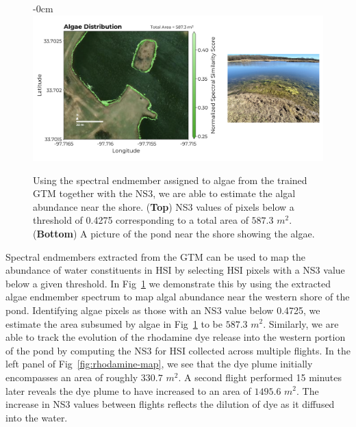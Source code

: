 \documentclass[remotesensing,article,submit,pdftex,moreauthors]{Definitions/mdpi}
\begin{document}
\begin{figure}[t]
\begin{adjustwidth}{-\extralength}{0cm}
\centering
\includegraphics[width=17.0cm]{paper/figures/results/algae.png}
\end{adjustwidth}
\caption{Using the spectral endmember assigned to algae from the trained GTM together with the NS3, we are able to estimate the algal abundance near the shore. (\textbf{Top}) NS3 values of pixels below a threshold of 0.4275 corresponding to a total area of $587.3$ $m^2$. (\textbf{Bottom}) A picture of the pond near the shore showing the algae.\label{fig:algae-map}}
\end{figure}  

Spectral endmembers extracted from the GTM can be used to map the abundance of water constituents in HSI by selecting HSI pixels with a NS3 value below a given threshold. In Fig~\ref{fig:algae-map} we demonstrate this by using the extracted algae endmember spectrum to map algal abundance near the western shore of the pond. Identifying algae pixels as those with an NS3 value below 0.4725, we estimate the area subsumed by algae in Fig~\ref{fig:algae-map} to be $587.3$ $m^2$. Similarly, we are able to track the evolution of the rhodamine dye release into the western portion of the pond by computing the NS3 for HSI collected across multiple flights. In the left panel of Fig~\ref{fig:rhodamine-map}, we see that the dye plume initially encompasses an area of roughly $330.7$ $m^2$. A second flight performed 15 minutes later reveals the dye plume to have increased to an area of $1495.6$ $m^2$. The increase in NS3 values between flights reflects the dilution of dye as it diffused into the water.


\newpage 
\end{document}
